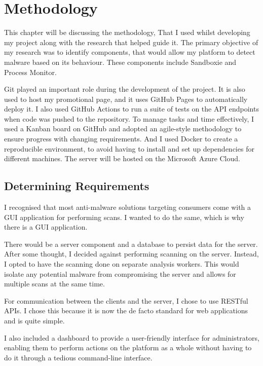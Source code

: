 \chapter{Methodology}

This chapter will be discussing the methodology,
That I used whilst developing my project
along with the research that helped guide it.
The primary objective of my research was to identify components,
that would allow my platform to detect malware based on its behaviour.
These components include Sandboxie and Process Monitor.

Git played an important role during the development of the project.
It is also used to host my promotional page,
and it uses GitHub Pages to automatically deploy it.
I also used GitHub Actions to run a suite of tests on the
API endpoints when code was pushed to the repository.
To manage tasks and time effectively, I used a Kanban board on GitHub
and adopted an agile-style methodology to ensure
progress with changing requirements.
And I used Docker to create a reproducible environment,
to avoid having to install and set up dependencies for different machines.
The server will be hosted on the Microsoft Azure Cloud.

\section{Determining Requirements}
I recognised that most anti-malware solutions targeting consumers
come with a GUI application for performing scans.
I wanted to do the same, which is why there is a GUI application.

There would be a server component and a database to persist data for the server.
After some thought, I decided against performing scanning on the server.
Instead, I opted to have the scanning done on separate analysis workers.
This would isolate any potential malware from compromising the server and
allows for multiple scans at the same time.

For communication between the clients and the server, I chose to use RESTful APIs.
I chose this because it is now the de facto standard for web applications and is quite simple.

I also included a dashboard to provide a user-friendly interface for administrators,
enabling them to perform actions on the platform as a whole without
having to do it through a tedious command-line interface.

